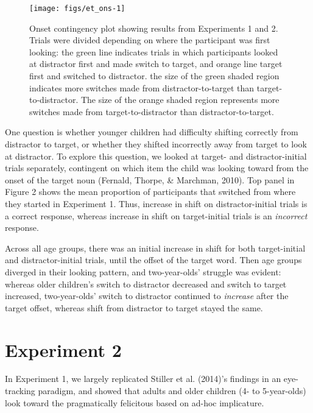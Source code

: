 \documentclass[a4paper,man,apacite,floatsintext]{apa6}
\newenvironment{CodeChunk}{}{}
\begin{document}
\begin{CodeChunk}
\begin{figure}[H]

{\centering \texttt{[image: figs/et\_ons-1]} 

}

\caption[Onset contingency plot showing results from Experiments 1 and 2]{Onset contingency plot showing results from Experiments 1 and 2. Trials were divided depending on where the participant was first looking: the green line indicates trials in which participants looked at distractor first and made switch to target, and orange line target first and switched to distractor. the size of the green shaded region indicates more switches made from distractor-to-target than target-to-distractor. The size of the orange shaded region represents more switches made from target-to-distractor than distractor-to-target.}\label{fig:et_ons}
\end{figure}
\end{CodeChunk}

One question is whether younger children had difficulty shifting
correctly from distractor to target, or whether they shifted incorrectly
away from target to look at distractor. To explore this question, we
looked at target- and distractor-initial trials separately, contingent
on which item the child was looking toward from the onset of the target
noun (Fernald, Thorpe, \& Marchman, 2010). Top panel in Figure 2 shows
the mean proportion of participants that switched from where they
started in Experiment 1. Thus, increase in shift on distractor-initial
trials is a correct response, whereas increase in shift on
target-initial trials is an \emph{incorrect} response.

Across all age groups, there was an initial increase in shift for both
target-initial and distractor-initial trials, until the offset of the
target word. Then age groups diverged in their looking pattern, and
two-year-olds' struggle was evident: whereas older children's switch to
distractor decreased and switch to target increased, two-year-olds'
switch to distractor continued to \emph{increase} after the target
offset, whereas shift from distractor to target stayed the same.

\section{Experiment 2}\label{experiment-2}

In Experiment 1, we largely replicated Stiller et al. (2014)'s findings
in an eye-tracking paradigm, and showed that adults and older children
(4- to 5-year-olds) look toward the pragmatically felicitous based on
ad-hoc implicature.
\end{document}

